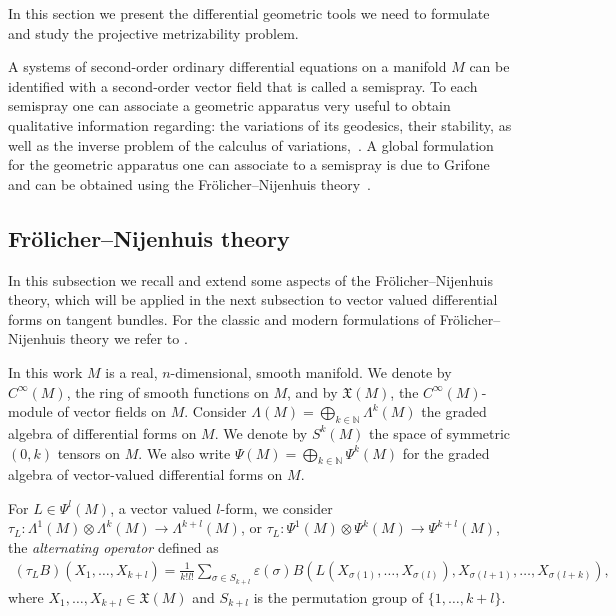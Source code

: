 \documentclass[11pt]{article}
\numberwithin{equation}{section}
\begin{document}
In this section we present the dif\/ferential geometric tools
we need to formulate and study the projective metrizability problem.

A systems of second-order ordinary dif\/ferential equations on a
manifold $M$ can be identif\/ied with a second-order vector f\/ield
that is called a semispray. To each semispray one can associate a
geometric apparatus very useful to obtain qualitative information
regarding: the variations of its geodesics, their stability, as
well as the inverse problem of the calculus of variations,~\cite{bcd10}.
A global formulation for the geometric apparatus one can associate
to a semispray is due to Grifone \cite{grifone72} and can be
obtained using the Fr\"olicher--Nijenhuis theo\-ry~\cite{frolicher56}.

\subsection[Fr\"olicher-Nijenhuis theory]{Fr\"olicher--Nijenhuis theory} \label{subsec:fn}

In this subsection we recall and extend some aspects of the
Fr\"olicher--Nijenhuis theory, which will be applied in the next
subsection to vector valued dif\/ferential forms on tangent bundles.
For the classic and modern formulations of Fr\"olicher--Nijenhuis theory we
refer to \cite{frolicher56, grifone72, grifone00, KMS93, deleon89}.

In this work $M$ is a real, $n$-dimensional, smooth manifold. We
denote by $C^{\infty}(M)$, the ring of smooth functions on $M$,
and by ${\mathfrak X}(M)$, the $C^{\infty}(M)$-module of vector
f\/ields on $M$. Consider $\Lambda(M)=\bigoplus_{k\in {\mathbb
N}}\Lambda^k(M)$ the graded algebra of dif\/ferential forms on $M$. We
denote by $S^k(M)$ the space of symmetric $(0,k)$ tensors on $M$.
We also write $\Psi(M)=\bigoplus_{k\in {\mathbb N}}\Psi^k(M)$ for the
graded algebra of vector-valued dif\/ferential forms on $M$.

For $L\in \Psi^l(M)$, a vector valued $l$-form, we consider
$\tau_L: \Lambda^1(M) \otimes \Lambda^k(M) \to \Lambda^{k+l}(M)$,
or $\tau_L: \Psi^1(M) \otimes \Psi^k(M) \to \Psi^{k+l}(M)$, the
\emph{alternating operator} def\/ined as
\begin{gather}
\label{taull}  (\tau_L B)(X_1,\dots ,X_{k+l}) = \frac{1}{k!l!} \sum_{\sigma \in S_{k+l}}
\varepsilon(\sigma) B(L(X_{\sigma(1)},\dots , X_{\sigma(l)}),
X_{\sigma(l+1)},\dots , X_{\sigma(l+k)}),
\end{gather}
where
$X_1,\dots , X_{k+l} \in {\mathfrak X}(M)$ and $S_{k+l}$ is the
permutation group of $\{1,\dots , k+l\}$.
\end{document}

